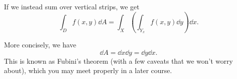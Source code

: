 \begin{center}

\end{center}

If we instead sum over vertical strips, we get 
$$
	\int_D f(x, y) \dd A = \int_X \left(\int_{Y_x} f(x, y) \dd y\right) \dd x.
$$

More concisely, we have
$$
\dd A = \dd x \dd y = \dd y \dd x. 
$$
This is known as Fubini's theorem (with a few caveats that we won't worry about), which you may meet properly in a later course.

